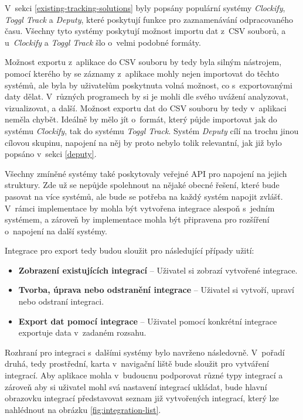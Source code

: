 V~sekci \ref{existing-tracking-solutions} byly popsány populární systémy \emph{Clockify}, \emph{Toggl Track} a \emph{Deputy}, které poskytují funkce pro zaznamenávání odpracovaného času. Všechny tyto systémy poskytují možnost importu dat z~CSV souborů, a u~\emph{Clockify} a \emph{Toggl Track} šlo o~velmi podobné formáty.

Možnost exportu z~aplikace do CSV souboru by tedy byla silným nástrojem, pomocí kterého by se záznamy z~aplikace mohly nejen importovat do těchto systémů, ale byla by uživatelům poskytnuta volná možnost, co s~exportovanými daty dělat. V~různých programech by si je mohli dle svého uvážení analyzovat, vizualizovat, a další. Možnost exportu dat do CSV souboru by tedy v~aplikaci neměla chybět. Ideálně by mělo jít o~formát, který půjde importovat jak do systému \emph{Clockify}, tak do systému \emph{Toggl Track}. Systém \emph{Deputy} cílí na trochu jinou cílovou skupinu, napojení na něj by proto nebylo tolik relevantní, jak již bylo popsáno v~sekci \ref{deputy}.

Všechny zmíněné systémy také poskytovaly veřejné API pro napojení na jejich struktury. Zde už se nepůjde spolehnout na nějaké obecné řešení, které bude pasovat na více systémů, ale bude se potřeba na každý systém napojit zvlášť. V~rámci implementace by mohla být vytvořena integrace alespoň s~jedním systémem, a zároveň by implementace mohla být připravena pro rozšíření o~napojení na další systémy.

Integrace pro export tedy budou sloužit pro následující případy užití:
\begin{itemize}
\item\textbf{Zobrazení existujících integrací} – Uživatel si zobrazí vytvořené integrace.
\item\textbf{Tvorba, úprava nebo odstranění integrace} – Uživatel si vytvoří, upraví nebo odstraní integraci.
\item\textbf{Export dat pomocí integrace} – Uživatel pomocí konkrétní integrace exportuje data v~zadaném rozsahu.
\end{itemize}

Rozhraní pro integraci s~dalšími systémy bylo navrženo následovně. V~pořadí druhá, tedy prostřední, karta v~navigační liště bude sloužit pro vytváření integrací. Aby aplikace mohla v~budoucnu podporovat různé typy integrací a zároveň aby si uživatel mohl svá nastavení integrací ukládat, bude hlavní obrazovku integrací představovat seznam již vytvořených integrací, který lze nahlédnout na obrázku \ref{fig:integration-list}.

